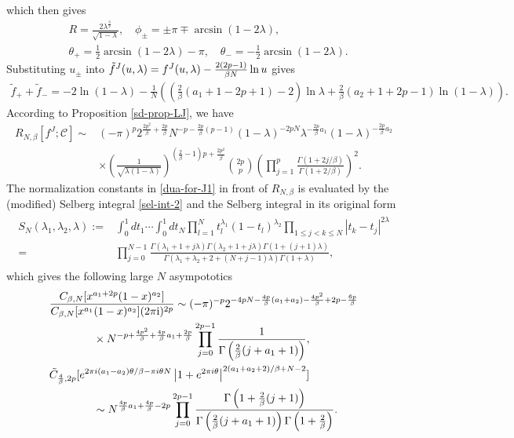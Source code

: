 \documentclass[11pt,a4paper]{article}
\numberwithin{equation}{section} %
\theoremstyle{plain}
\theoremstyle{definition}
\numberwithin{prop}{section}
\numberwithin{cor}{section}
\numberwithin{remark}{section}
\begin{document}
which then gives
\begin{align*}
&R=\frac{2 \lambda^{\frac{3}{2}}}{\sqrt{1-\lambda}}, \quad \phi_{ \pm}= \pm \pi \mp \arcsin (1-2 \lambda),\\
&\theta_+=\frac{1}{2} \arcsin (1-2 \lambda)-\pi,\quad
\theta_{-}=-\frac{1}{2} \arcsin (1-2 \lambda).
\end{align*}
Substituting $u_\pm$ into $\tilde{f}^J(u,\lambda)=f^J(u,\lambda)-{2(2p-1)\over \beta N} \ln u$ gives
\begin{align*}
    \tilde{f}_{+}+\tilde{f}_{-}=-2 \ln (1-\lambda)-\frac{1}{N}\left(\left(\frac{2}{\beta}\left(a_1+1-2 p+1\right)-2\right) \ln \lambda+\frac{2}{\beta}\left(a_2+1+2 p-1\right) \ln (1-\lambda)\right).
\end{align*}
According to Proposition \ref{sd-prop-LJ}, we have
\begin{align*}
    R_{N,\beta}[f^J;\mathcal{C}]\sim& (-\pi)^p2^{\frac{2p^2}{\beta}+\frac{2p}{\beta
    }}N^{-p-\frac{2 p}{\beta}(p-1)}(1-\lambda)^{-2 p N} \lambda^{-\frac{2 p}{\beta} a_1}(1-\lambda)^{-\frac{2 p}{\beta} a_2}\\
    &\times\left(\frac{1}{\sqrt{\lambda(1-\lambda)}}\right)^{\left(\frac{2}{\beta}-1\right) p+\frac{2 p^2}{\beta}}\binom{2p}{p}\left(\prod_{j=1}^{p}\frac{\Gamma(1+2j/\beta)}{\Gamma(1+2/\beta)}\right)^2.
\end{align*}
The normalization constants in \eqref{dua-for-J1} in front of $R_{N,\beta}$ is evaluated by the (modified) Selberg integral \eqref{sel-int-2} and the Selberg integral in its
original form \cite[\S 4.1]{Fo10}
\begin{align}\label{sel-int3}
\begin{aligned}
    S_N\left(\lambda_1, \lambda_2, \lambda\right):=&\int_0^1 d t_1 \cdots \int_0^1 d t_N \prod_{l=1}^N t_l^{\lambda_1}\left(1-t_l\right)^{\lambda_2} \prod_{1 \leq j<k \leq N}\left|t_k-t_j\right|^{2 \lambda}\\
    =&\prod_{j=0}^{N-1} \frac{\Gamma\left(\lambda_1+1+j \lambda\right) \Gamma\left(\lambda_2+1+j \lambda\right) \Gamma(1+(j+1) \lambda)}{\Gamma\left(\lambda_1+\lambda_2+2+(N+j-1) \lambda\right) \Gamma(1+\lambda)},
\end{aligned}
\end{align}
which gives the following large $N$ asympototics
    \begin{align*}
    &\frac{C_{\beta,N}[x^{a_1+2p}(1-x)^{a_2}]}{C_{\beta,N}[x^{a_1}(1-x)^{a_2}](2\pi \mathrm{i})^{2p}}\sim  (-\pi)^{-p} 2^{-4 p N-\frac{4 p}{\beta}\left(a_1+a_2\right)-\frac{4 p^2}{\beta}+2p-\frac{6 p}{\beta}} \\
    &\qquad\qquad \times N^{-p+\frac{4 p^2}{\beta}+\frac{4 p}{\beta} a_1+\frac{2 p}{\beta}}\prod_{j=0}^{2p-1}\frac{1}{\Gamma\left(\frac{2}{\beta}(j+a_1+1)\right)},\\
    &\tilde{C}_{\frac{4}{\beta},2p}[e^{2 \pi i\left(a_1-a_2\right) \theta / \beta-\pi i \theta N}\left|1+e^{2 \pi i \theta}\right|^{2\left(a_1+a_2+2\right) / \beta+N-2}]\\
    &\qquad\qquad\sim N^{\frac{4 p}{\beta} a_1+\frac{4 p}{\beta}-2 p}\prod_{j=0}^{2p-1}\frac{\Gamma\left(1+{2\over\beta}(j+1)\right)}{\Gamma\left(\frac{2}{\beta}(j+a_1+1)\right)\Gamma\left(1+\frac{2}{\beta}\right)}.
\end{align*}
\end{document}
